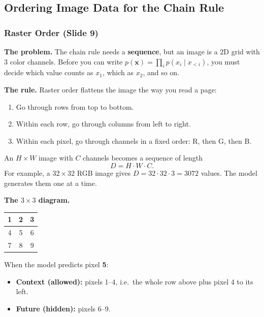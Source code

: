 
\subsection*{Ordering Image Data for the Chain Rule}

\subsubsection*{Raster Order (Slide 9)}

\textbf{The problem.} The chain rule needs a \textbf{sequence}, but an image is a 2D grid with 3 color channels. Before you can write $p(\mathbf{x}) = \prod_i p(x_i \mid x_{<i})$, you must decide which value counts as $x_1$, which as $x_2$, and so on.

\textbf{The rule.} Raster order flattens the image the way you read a page:
\begin{enumerate}
  \item Go through rows from top to bottom.
  \item Within each row, go through columns from left to right.
  \item Within each pixel, go through channels in a fixed order: R, then G, then B.
\end{enumerate}

An $H \times W$ image with $C$ channels becomes a sequence of length
$$D = H \cdot W \cdot C.$$
For example, a $32 \times 32$ RGB image gives $D = 32 \cdot 32 \cdot 3 = 3072$ values. The model generates them one at a time.

\textbf{The $3\times3$ diagram.}
\begin{center}
\begin{tabular}{|c|c|c|}
\hline
1 & 2 & 3 \\ \hline
4 & 5 & 6 \\ \hline
7 & 8 & 9 \\ \hline
\end{tabular}
\end{center}

When the model predicts pixel \textbf{5}:
\begin{itemize}
  \item \textbf{Context (allowed):} pixels 1--4, i.e.\ the whole row above plus pixel 4 to its left.
  \item \textbf{Future (hidden):} pixels 6--9.
\end{itemize}

